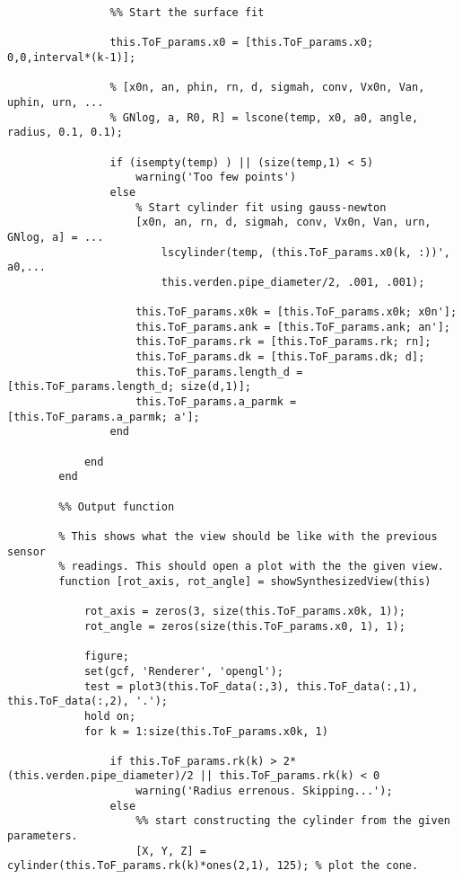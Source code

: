 \begin{lstlisting}
                %% Start the surface fit
                
                this.ToF_params.x0 = [this.ToF_params.x0; 0,0,interval*(k-1)];
                
                % [x0n, an, phin, rn, d, sigmah, conv, Vx0n, Van, uphin, urn, ...
                % GNlog, a, R0, R] = lscone(temp, x0, a0, angle, radius, 0.1, 0.1);
                
                if (isempty(temp) ) || (size(temp,1) < 5)
                    warning('Too few points')
                else
                    % Start cylinder fit using gauss-newton
                    [x0n, an, rn, d, sigmah, conv, Vx0n, Van, urn, GNlog, a] = ...
                        lscylinder(temp, (this.ToF_params.x0(k, :))', a0,...
                        this.verden.pipe_diameter/2, .001, .001);
                    
                    this.ToF_params.x0k = [this.ToF_params.x0k; x0n'];
                    this.ToF_params.ank = [this.ToF_params.ank; an'];
                    this.ToF_params.rk = [this.ToF_params.rk; rn];
                    this.ToF_params.dk = [this.ToF_params.dk; d];
                    this.ToF_params.length_d = [this.ToF_params.length_d; size(d,1)];
                    this.ToF_params.a_parmk = [this.ToF_params.a_parmk; a'];
                end
                
            end
        end
        
        %% Output function
        
        % This shows what the view should be like with the previous sensor
        % readings. This should open a plot with the the given view.
        function [rot_axis, rot_angle] = showSynthesizedView(this)
            
            rot_axis = zeros(3, size(this.ToF_params.x0k, 1));
            rot_angle = zeros(size(this.ToF_params.x0, 1), 1);
            
            figure;
            set(gcf, 'Renderer', 'opengl');
            test = plot3(this.ToF_data(:,3), this.ToF_data(:,1), this.ToF_data(:,2), '.');
            hold on;
            for k = 1:size(this.ToF_params.x0k, 1)
                
                if this.ToF_params.rk(k) > 2*(this.verden.pipe_diameter)/2 || this.ToF_params.rk(k) < 0
                    warning('Radius errenous. Skipping...');
                else
                    %% start constructing the cylinder from the given parameters.
                    [X, Y, Z] = cylinder(this.ToF_params.rk(k)*ones(2,1), 125); % plot the cone.
                    

\end{lstlisting}
